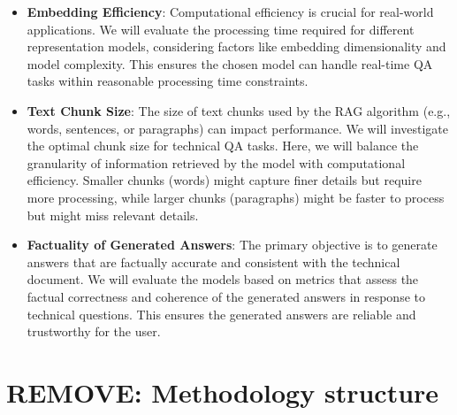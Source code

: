 \begin{itemize}
  \item \textbf{Embedding Efficiency}:
    Computational efficiency is crucial for real-world applications.
    We will evaluate the processing time required for different representation models, considering factors like embedding dimensionality and model complexity.
    This ensures the chosen model can handle real-time \ac{QA} tasks within reasonable processing time constraints.
  \item \textbf{Text Chunk Size}:
    The size of text chunks used by the \ac{RAG} algorithm (e.g., words, sentences, or paragraphs) can impact performance.
    We will investigate the optimal chunk size for technical \ac{QA} tasks.
    Here, we will balance the granularity of information retrieved by the model with computational efficiency.
    Smaller chunks (words) might capture finer details but require more processing, while larger chunks (paragraphs) might be faster to process but might miss relevant details.  
  \item \textbf{Factuality of Generated Answers}:
    The primary objective is to generate answers that are factually accurate and consistent with the technical document.
    We will evaluate the models based on metrics that assess the factual correctness and coherence of the generated answers in response to technical questions.
    This ensures the generated answers are reliable and trustworthy for the user.
\end{itemize}


\section{REMOVE: Methodology structure}

